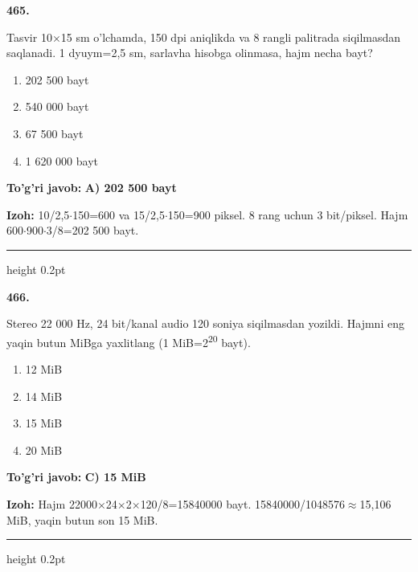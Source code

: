 \documentclass[10pt,a4paper,oneside]{article}
\begin{document}
\noindent\textbf{\color{ink}465.}
\par
Tasvir 10\ensuremath{\times}15 sm o'lchamda, 150 dpi aniqlikda va 8 rangli palitrada siqilmasdan saqlanadi. 1 dyuym=2,5 sm, sarlavha hisobga olinmasa, hajm necha bayt?
\begin{enumerate}[label=\Alph*),leftmargin=9mm]
\item 202 500 bayt
\item 540 000 bayt
\item 67 500 bayt
\item 1 620 000 bayt
\end{enumerate}
\begin{tcolorbox}[enhanced,breakable,colback=teal!4,colframe=teal!50!black,boxrule=0.5pt,arc=1.1mm,left=3mm,right=3mm,top=1.7mm,bottom=1.7mm,before skip=2mm,after skip=2mm]
\textbf{\color{teal}To'g'ri javob:} \textbf{A) 202 500 bayt}
\par\smallskip
\textbf{Izoh:} 10/2,5\ensuremath{\cdot}150=600 va 15/2,5\ensuremath{\cdot}150=900 piksel. 8 rang uchun 3 bit/piksel. Hajm 600\ensuremath{\cdot}900\ensuremath{\cdot}3/8=202 500 bayt.
\end{tcolorbox}
\vspace{2mm}\hrule height 0.2pt \vspace{3mm}

\noindent\textbf{\color{ink}466.}
\par
Stereo 22 000 Hz, 24 bit/kanal audio 120 soniya siqilmasdan yozildi. Hajmni eng yaqin butun MiBga yaxlitlang (1 MiB=2\textsuperscript{2}\textsuperscript{0} bayt).
\begin{enumerate}[label=\Alph*),leftmargin=9mm]
\item 12 MiB
\item 14 MiB
\item 15 MiB
\item 20 MiB
\end{enumerate}
\begin{tcolorbox}[enhanced,breakable,colback=teal!4,colframe=teal!50!black,boxrule=0.5pt,arc=1.1mm,left=3mm,right=3mm,top=1.7mm,bottom=1.7mm,before skip=2mm,after skip=2mm]
\textbf{\color{teal}To'g'ri javob:} \textbf{C) 15 MiB}
\par\smallskip
\textbf{Izoh:} Hajm 22000\ensuremath{\times}24\ensuremath{\times}2\ensuremath{\times}120/8=15840000 bayt. 15840000/1048576\ensuremath{\approx}15,106 MiB, yaqin butun son 15 MiB.
\end{tcolorbox}
\vspace{2mm}\hrule height 0.2pt \vspace{3mm}
\end{document}
